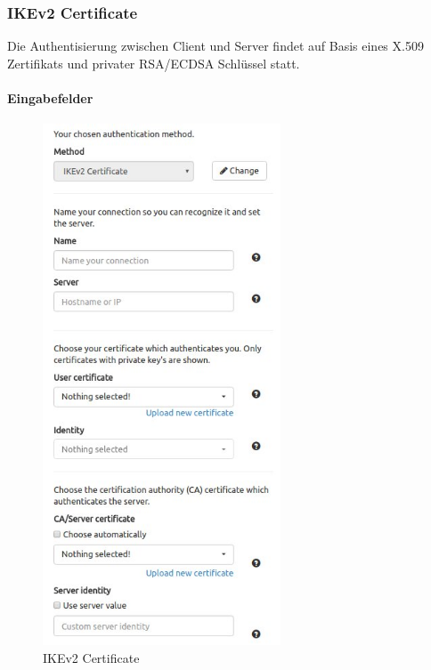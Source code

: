 \subsubsection{IKEv2 Certificate}
Die Authentisierung zwischen Client und Server findet auf Basis eines X.509 Zertifikats und privater RSA/ECDSA Schlüssel statt.\\
\noindent\begin{minipage}[t]{0.5\textwidth}
\vspace{0pt}
\paragraph{Eingabefelder}\mbox{}\medskip
    \begin{figure}[H]
    	\centering
    	\includegraphics[width=200pt]{images/forms/cert_form.jpg}
    	\caption{IKEv2 Certificate}
    \end{figure}
\end{minipage}
\hfill
